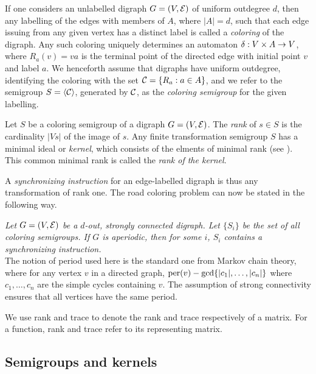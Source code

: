 If one considers an unlabelled digraph $G = (V,\E)$ of uniform outdegree $d$, then any labelling of the edges with members of $A$, where $|A| = d$, such that each edge issuing from any given vertex has a distinct label is called a \textit{coloring} of the digraph.
Any such coloring uniquely determines an automaton $\dl: V \times A \to V$, where $R_a(v) = va$ is the terminal point of the directed edge with initial point $v$ and label $a$.  
We henceforth assume that digraphs have uniform outdegree, identifying the coloring with the set $\C = \{R_a: a \in A\}$, and we refer to the semigroup $S = \lr \C \rlr$, generated by $\C$, as the \textit{coloring semigroup} for the given labelling.

\begin{definition}   \label{defn:4.6}
Let $S$ be a coloring semigroup of a digraph $G = (V,\E)$.
The \textit{rank} of $s \in S$ is the cardinality $|Vs|$ of the image of $s$.
Any finite transformation semigroup $S$ has a minimal ideal or \textit{kernel}, which consists of the elments of minimal rank (see \cite{H}).
This common minimal rank is called the \textit{rank of the kernel}.
\end{definition}

A \textit{synchronizing instruction} for an edge-labelled digraph is thus any transformation of rank one.
The road coloring problem can now be stated in the following way.

\textit{Let $G = (V,\E)$ be a $d$-out, strongly connected digraph.
Let $\{S_i\}$ be the set of all coloring semigroups.  
If $G$ is aperiodic, then for some $i$, $S_i$ contains a synchronizing instruction.} \\

The notion of period used here is the standard one from Markov chain theory, where for any vertex $v$ in a directed graph, $\hbox{per}(v) - \gcd\{|c_1|, \ldots , |c_n|\}$ where $c_1, \ldots , c_n$ are the simple cycles containing $v$.
The assumption of strong connectivity ensures that all vertices have the same period.

  We use rank and trace to denote the rank and trace respectively of a matrix.
For a function, rank and trace refer to its representing matrix.

\subsection{Semigroups and kernels}
\label{sec:4.8.2}

